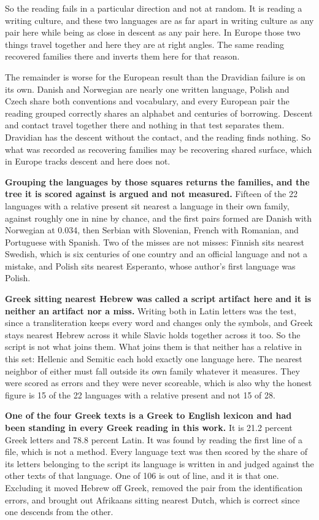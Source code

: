 So the reading fails in a particular direction and not at random. It is reading a writing culture, and these two languages are as far apart in writing culture as any pair here while being as close in descent as any pair here. In Europe those two things travel together and here they are at right angles. The same reading recovered families there and inverts them here for that reason.

The remainder is worse for the European result than the Dravidian failure is on its own. Danish and Norwegian are nearly one written language, Polish and Czech share both conventions and vocabulary, and every European pair the reading grouped correctly shares an alphabet and centuries of borrowing. Descent and contact travel together there and nothing in that test separates them. Dravidian has the descent without the contact, and the reading finds nothing. So what was recorded as recovering families may be recovering shared surface, which in Europe tracks descent and here does not.

\textbf{Grouping the languages by those squares returns the families, and the tree it is scored against is argued and not measured.} Fifteen of the 22 languages with a relative present sit nearest a language in their own family, against roughly one in nine by chance, and the first pairs formed are Danish with Norwegian at 0.034, then Serbian with Slovenian, French with Romanian, and Portuguese with Spanish. Two of the misses are not misses: Finnish sits nearest Swedish, which is six centuries of one country and an official language and not a mistake, and Polish sits nearest Esperanto, whose author's first language was Polish.

\textbf{Greek sitting nearest Hebrew was called a script artifact here and it is neither an artifact nor a miss.} Writing both in Latin letters was the test, since a transliteration keeps every word and changes only the symbols, and Greek stays nearest Hebrew across it while Slavic holds together across it too. So the script is not what joins them. What joins them is that neither has a relative in this set: Hellenic and Semitic each hold exactly one language here. The nearest neighbor of either must fall outside its own family whatever it measures. They were scored as errors and they were never scoreable, which is also why the honest figure is 15 of the 22 languages with a relative present and not 15 of 28.

\textbf{One of the four Greek texts is a Greek to English lexicon and had been standing in every Greek reading in this work.} It is 21.2 percent Greek letters and 78.8 percent Latin. It was found by reading the first line of a file, which is not a method. Every language text was then scored by the share of its letters belonging to the script its language is written in and judged against the other texts of that language. One of 106 is out of line, and it is that one. Excluding it moved Hebrew off Greek, removed the pair from the identification errors, and brought out Afrikaans sitting nearest Dutch, which is correct since one descends from the other.

